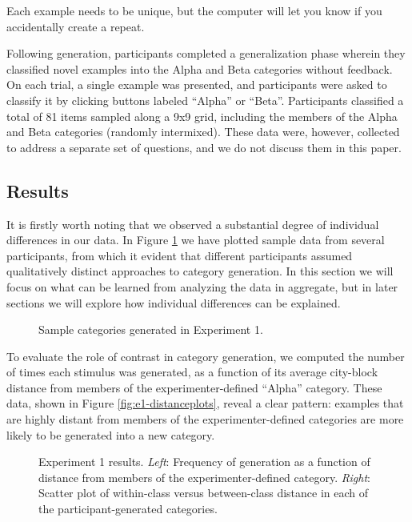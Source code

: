 \documentclass[12pt]{article}
\newcommand\inputpgf[2]{{
\let\pgfimageWithoutPath\pgfimage
\renewcommand{\pgfimage}[2][]{\pgfimageWithoutPath[##1]{#1/##2}}

}}
\begin{document}
\begin{flushleft}
\begin{displayquote}
Each example needs to be unique, but the computer will let you know if you accidentally create a repeat.
\end{displayquote}

Following generation, participants completed a generalization phase wherein they classified novel examples into the Alpha and Beta categories without feedback. On each trial, a single example was presented, and participants were asked to classify it by clicking buttons labeled ``Alpha'' or ``Beta''. Participants classified a total of 81 items sampled along a 9x9 grid, including the members of the Alpha and Beta categories (randomly intermixed). These data were, however, collected to address a separate set of questions, and we do not discuss them in this paper.

\subsection{Results}

It is firstly worth noting that we observed a substantial degree of individual differences in our data. In Figure \ref{fig:e1-samples} we have plotted sample data from several participants, from which it evident that different participants assumed qualitatively distinct approaches to category generation. In this section we will focus on what can be learned from analyzing the data in aggregate, but in later sections we will explore how individual differences can be explained.

\begin{figure}
    \begin{center}
    \inputpgf{figs/}{e1-samples.pgf}
    \caption{Sample categories generated in Experiment 1. }
    \label{fig:e1-samples}
    \end{center}
\end{figure}

To evaluate the role of contrast in category generation, we computed the number of times each stimulus was generated, as a function of its average city-block distance from members of the experimenter-defined ``Alpha'' category. These data, shown in Figure \ref{fig:e1-distanceplots}, reveal a clear pattern: examples that are highly distant from members of the experimenter-defined categories are more likely to be generated into a new category. 

\begin{figure}
    \begin{center}
    \inputpgf{figs/}{e1-distanceplots.pgf}
    \caption{Experiment 1 results. \textit{Left}: Frequency of generation as a function of distance from members of the experimenter-defined category. \textit{Right}: Scatter plot of within-class versus between-class distance in each of the participant-generated categories.}


\end{center}
\end{figure}
\end{flushleft}
\end{document}
